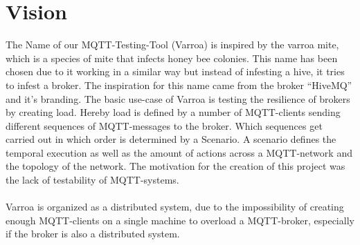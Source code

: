 \chapter{Vision}
The Name of our MQTT-Testing-Tool (Varroa) is inspired by the varroa mite, which is a species of mite that infects honey bee colonies.
This name has been chosen due to it working in a similar way but instead of infesting a hive, it tries to infest a broker.
The inspiration for this name came from the broker \enquote{HiveMQ} and it's branding.
The basic use-case of Varroa is testing the resilience of brokers by creating load.
Hereby load is defined by a number of MQTT-clients sending different sequences of MQTT-messages to the broker. 
Which sequences get carried out in which order is determined by a Scenario.
A scenario defines the temporal execution as well as the amount of actions across a MQTT-network and the topology of the network.
The motivation for the creation of this project was the lack of testability of MQTT-systems.\\
\\
Varroa is organized as a distributed system, due to the impossibility of creating enough MQTT-clients on a single machine to overload a MQTT-broker, especially if the broker is also a distributed system.
